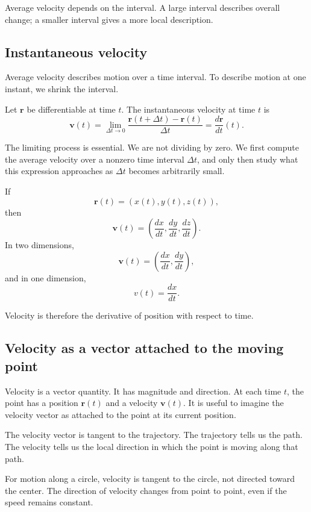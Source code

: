 \begin{remarkbox}
Average velocity depends on the interval. A large interval describes overall change; a smaller interval gives a more local description.
\end{remarkbox}

\subsection{Instantaneous velocity}

Average velocity describes motion over a time interval. To describe motion at one instant, we shrink the interval.

\begin{definitionbox}
Let \(\mathbf{r}\) be differentiable at time \(t\). The instantaneous velocity at time \(t\) is
\[
\mathbf{v}(t)
=
\lim_{\Delta t\to 0}
\frac{\mathbf{r}(t+\Delta t)-\mathbf{r}(t)}{\Delta t}
=
\frac{d\mathbf{r}}{dt}(t).
\]
\end{definitionbox}

The limiting process is essential. We are not dividing by zero. We first compute the average velocity over a nonzero time interval \(\Delta t\), and only then study what this expression approaches as \(\Delta t\) becomes arbitrarily small.

If
\[
\mathbf{r}(t)=(x(t),y(t),z(t)),
\]
then
\[
\mathbf{v}(t)=\left(\frac{dx}{dt},\frac{dy}{dt},\frac{dz}{dt}\right).
\]
In two dimensions,
\[
\mathbf{v}(t)=\left(\frac{dx}{dt},\frac{dy}{dt}\right),
\]
and in one dimension,
\[
v(t)=\frac{dx}{dt}.
\]

Velocity is therefore the derivative of position with respect to time.

\subsection{Velocity as a vector attached to the moving point}

Velocity is a vector quantity. It has magnitude and direction. At each time \(t\), the point has a position \(\mathbf{r}(t)\) and a velocity \(\mathbf{v}(t)\). It is useful to imagine the velocity vector as attached to the point at its current position.

The velocity vector is tangent to the trajectory. The trajectory tells us the path. The velocity tells us the local direction in which the point is moving along that path.

\begin{remarkbox}
For motion along a circle, velocity is tangent to the circle, not directed toward the center. The direction of velocity changes from point to point, even if the speed remains constant.
\end{remarkbox}

